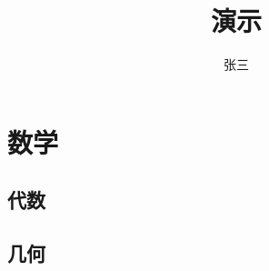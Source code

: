 \documentclass{ctexart}
\title{演示}
\author{张三}
\begin{document}
\maketitle
\section{数学}
\subsection{代数}
\subsection{几何}
\end{document}
